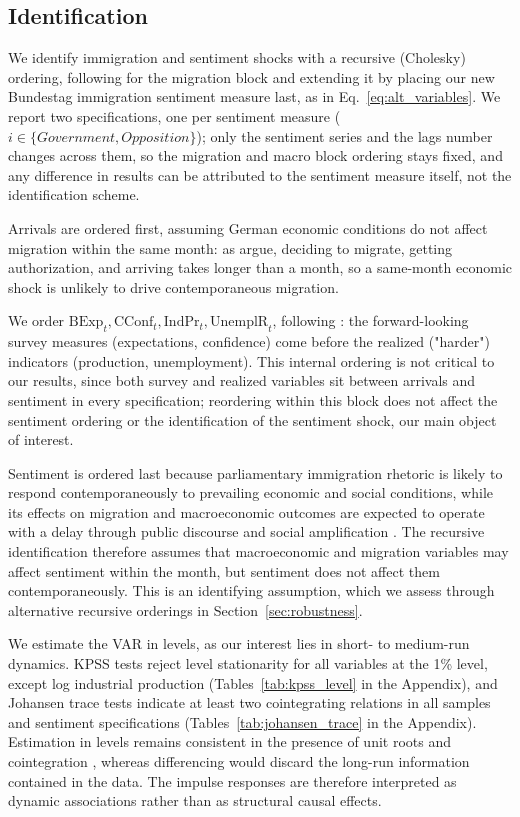 \documentclass[12pt]{scrartcl}
\numberwithin{equation}{section}				%
\begin{document}
    \subsection{Identification}
    \label{identification}
    
    We identify immigration and sentiment shocks with a recursive (Cholesky) ordering, following \parencite{maffei2021does} for the migration block and extending it by placing our new Bundestag immigration sentiment measure last, as in Eq.~\ref{eq:alt_variables}. We report two specifications, one per sentiment measure ($i \in \{\mathit{Government}, \mathit{Opposition}\}$); only the sentiment series and the lags number changes across them, so the migration and macro block ordering stays fixed, and any difference in results can be attributed to the sentiment measure itself, not the identification scheme.
    
    Arrivals are ordered first, assuming German economic conditions do not affect migration within the same month: as \parencite{maffei2021does} argue, deciding to migrate, getting authorization, and arriving takes longer than a month, so a same-month economic shock is unlikely to drive contemporaneous migration.
    
    We order $\text{BExp}_t, \text{CConf}_t, \text{IndPr}_t, \text{UnemplR}_t$, following \parencite{maffei2021does}: the forward-looking survey measures (expectations, confidence) come before the realized ("harder") indicators (production, unemployment). This internal ordering is not critical to our results, since both survey and realized variables sit between arrivals and sentiment in every specification; reordering within this block does not affect the sentiment ordering or the identification of the sentiment shock, our main object of interest. 
    
    Sentiment is ordered last because parliamentary immigration rhetoric is likely to respond contemporaneously to prevailing economic and social conditions, while its effects on migration and macroeconomic outcomes are expected to operate with a delay through public discourse and social amplification \parencite{abdelatif2026uncertainty,rakers20232015}. The recursive identification therefore assumes that macroeconomic and migration variables may affect sentiment within the month, but sentiment does not affect them contemporaneously. This is an identifying assumption, which we assess through alternative recursive orderings in Section~\ref{sec:robustness}.
    
    We estimate the VAR in levels, as our interest lies in short- to medium-run dynamics. KPSS tests reject level stationarity for all variables at the 1\% level, except log industrial production (Tables~\ref{tab:kpss_level} in the Appendix), and Johansen trace tests indicate at least two cointegrating relations in all samples and sentiment specifications (Tables~\ref{tab:johansen_trace} in the Appendix). Estimation in levels remains consistent in the presence of unit roots and cointegration \cite{sims1990inference}, whereas differencing would discard the long-run information contained in the data. The impulse responses are therefore interpreted as dynamic associations rather than as structural causal effects.
      
\end{document}
